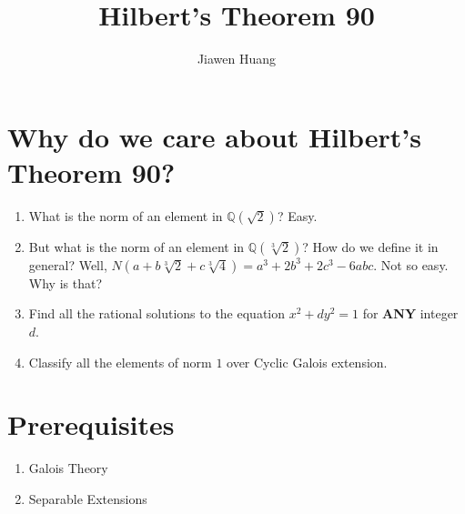 \documentclass[15pt]{scrartcl}
\newcommand{\Q}{\mathbb{Q}}
\begin{document}
\title{Hilbert's Theorem 90}
\date{}
\author{Jiawen Huang}
\maketitle

\section{Why do we care about Hilbert's Theorem 90?}
\begin{enumerate}
    \item What is the norm of an element in $\Q(\sqrt{2})$? Easy.
    \item But what is the norm of an element in $\Q(\sqrt[3]{2})$? How do we define it in general? Well, $N(a+b\sqrt[3]{2}+c\sqrt[3]{4})=a^3+2b^3+2c^3-6abc$. Not so easy. Why is that? 
    \item Find all the rational solutions to the equation $x^2+dy^2=1$ for \textbf{ANY} integer $d$.
    \item Classify all the elements of norm $1$ over Cyclic Galois extension.
\end{enumerate}


\section{Prerequisites}
\begin{enumerate}
    \item Galois Theory
    \item Separable Extensions 
\end{enumerate}
\end{document}

